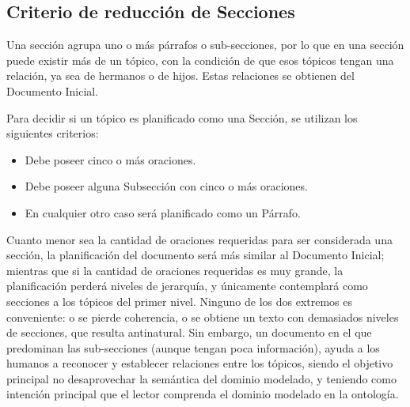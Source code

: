 \subsection{Criterio de reducción de Secciones}
Una sección agrupa uno o más párrafos o sub-secciones, por lo que en una sección puede existir más de un tópico, con la condición de que esos tópicos tengan una relación, ya sea de hermanos o de hijos. Estas relaciones se obtienen del Documento Inicial. 

Para decidir si un tópico es planificado como una Sección, se utilizan los siguientes criterios:
\begin{itemize}
    \item Debe poseer cinco o más oraciones.
    \item Debe poseer alguna Subsección con cinco o más oraciones.
    \item En cualquier otro caso será planificado como un Párrafo.
\end{itemize}



Cuanto menor sea la cantidad de oraciones requeridas para ser considerada una sección,  la planificación del documento será más similar al Documento Inicial; mientras que si la cantidad de  oraciones requeridas es muy grande, la planificación perderá niveles de jerarquía, y únicamente contemplará como secciones a los tópicos del primer nivel. Ninguno de los dos extremos es conveniente: o se pierde coherencia, o se obtiene un texto con demasiados niveles de secciones, que resulta antinatural. Sin embargo, un documento en el que predominan las sub-secciones (aunque tengan poca información), ayuda a los humanos a reconocer y establecer relaciones entre los tópicos, siendo el objetivo principal no desaprovechar la semántica del dominio modelado, y teniendo como intención principal que el lector comprenda el dominio modelado en la ontología.


